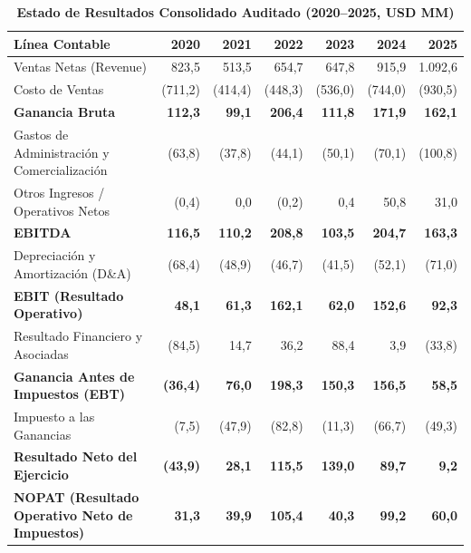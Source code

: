 \documentclass[11pt,a4paper]{article}
\begin{document}
\begin{table}[H]
\centering
\caption{\textbf{Estado de Resultados Consolidado Auditado (2020--2025, USD MM)}}
\scriptsize
\begin{tabularx}{\textwidth}{Xrrrrrr}
\toprule
\textbf{Línea Contable} & \textbf{2020} & \textbf{2021} & \textbf{2022} & \textbf{2023} & \textbf{2024} & \textbf{2025} \\
\midrule
Ventas Netas (Revenue) & 823,5 & 513,5 & 654,7 & 647,8 & 915,9 & 1.092,6 \\
Costo de Ventas & (711,2) & (414,4) & (448,3) & (536,0) & (744,0) & (930,5) \\
\textbf{Ganancia Bruta} & \textbf{112,3} & \textbf{99,1} & \textbf{206,4} & \textbf{111,8} & \textbf{171,9} & \textbf{162,1} \\
Gastos de Administración y Comercialización & (63,8) & (37,8) & (44,1) & (50,1) & (70,1) & (100,8) \\
Otros Ingresos / Operativos Netos & (0,4) & 0,0 & (0,2) & 0,4 & 50,8 & 31,0 \\
\textbf{EBITDA} & \textbf{116,5} & \textbf{110,2} & \textbf{208,8} & \textbf{103,5} & \textbf{204,7} & \textbf{163,3} \\
Depreciación y Amortización (D\&A) & (68,4) & (48,9) & (46,7) & (41,5) & (52,1) & (71,0) \\
\textbf{EBIT (Resultado Operativo)} & \textbf{48,1} & \textbf{61,3} & \textbf{162,1} & \textbf{62,0} & \textbf{152,6} & \textbf{92,3} \\
Resultado Financiero y Asociadas & (84,5) & 14,7 & 36,2 & 88,4 & 3,9 & (33,8) \\
\textbf{Ganancia Antes de Impuestos (EBT)} & \textbf{(36,4)} & \textbf{76,0} & \textbf{198,3} & \textbf{150,3} & \textbf{156,5} & \textbf{58,5} \\
Impuesto a las Ganancias & (7,5) & (47,9) & (82,8) & (11,3) & (66,7) & (49,3) \\
\textbf{Resultado Neto del Ejercicio} & \textbf{(43,9)} & \textbf{28,1} & \textbf{115,5} & \textbf{139,0} & \textbf{89,7} & \textbf{9,2} \\
\textbf{NOPAT (Resultado Operativo Neto de Impuestos)} & \textbf{31,3} & \textbf{39,9} & \textbf{105,4} & \textbf{40,3} & \textbf{99,2} & \textbf{60,0} \\
\bottomrule
\end{tabularx}
\end{table}
\end{document}
